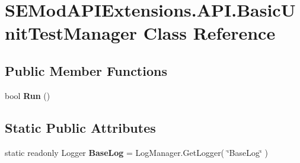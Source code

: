 \hypertarget{class_s_e_mod_a_p_i_extensions_1_1_a_p_i_1_1_basic_unit_test_manager}{}\section{S\+E\+Mod\+A\+P\+I\+Extensions.\+A\+P\+I.\+Basic\+Unit\+Test\+Manager Class Reference}
\label{class_s_e_mod_a_p_i_extensions_1_1_a_p_i_1_1_basic_unit_test_manager}
\subsection*{Public Member Functions}
\begin{DoxyCompactItemize}
\item 
\hypertarget{class_s_e_mod_a_p_i_extensions_1_1_a_p_i_1_1_basic_unit_test_manager_a34f13a3e57c1eadcd2050d841574cb74}{}bool {\bfseries Run} ()\label{class_s_e_mod_a_p_i_extensions_1_1_a_p_i_1_1_basic_unit_test_manager_a34f13a3e57c1eadcd2050d841574cb74}

\end{DoxyCompactItemize}
\subsection*{Static Public Attributes}
\begin{DoxyCompactItemize}
\item 
\hypertarget{class_s_e_mod_a_p_i_extensions_1_1_a_p_i_1_1_basic_unit_test_manager_a9c25574c1e08af33c55e7468d615c9c3}{}static readonly Logger {\bfseries Base\+Log} = Log\+Manager.\+Get\+Logger( \char`\"{}Base\+Log\char`\"{} )\label{class_s_e_mod_a_p_i_extensions_1_1_a_p_i_1_1_basic_unit_test_manager_a9c25574c1e08af33c55e7468d615c9c3}

\end{DoxyCompactItemize}
